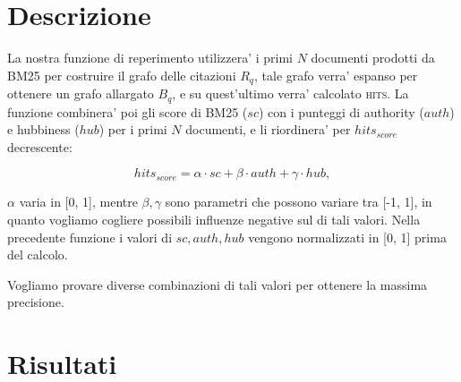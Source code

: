 \documentclass[12pt]{article}
\begin{document}
\maketitle

\section{Descrizione}
La nostra funzione di reperimento utilizzera' i primi $N$ documenti prodotti da BM25 per costruire il grafo delle citazioni $R_q$, tale grafo verra' espanso per ottenere un grafo allargato $B_q$, e su quest'ultimo verra' calcolato \textsc{hits}. La funzione combinera' poi gli score di BM25 ($sc$) con i punteggi di authority ($auth$) e hubbiness ($hub$) per i primi $N$ documenti, e li riordinera' per $hits_{score}$ decrescente:

\[ hits_{score} =  \alpha \cdot sc + \beta \cdot auth + \gamma \cdot hub,\]

$\alpha$ varia in [0, 1],  mentre $\beta, \gamma$ sono parametri che possono variare tra [-1, 1], in quanto vogliamo cogliere possibili influenze negative sul di tali valori. Nella precedente funzione i valori di $sc, auth, hub$ vengono normalizzati in [0, 1] prima del calcolo. 

 Vogliamo provare diverse combinazioni di tali valori per ottenere la massima precisione.



\section{Risultati}
\end{document}
